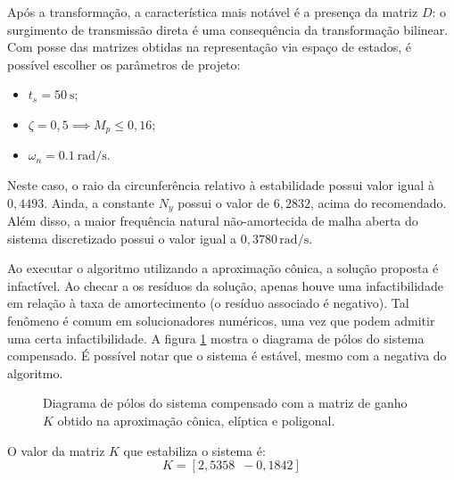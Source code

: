 Após a transformação, a característica mais notável é a presença da matriz $D$: o surgimento de transmissão direta é uma consequência da transformação bilinear\cite{CHIQUETO2021}. Com posse das matrizes obtidas na representação via espaço de estados, é possível escolher os parâmetros de projeto:
\begin{itemize}
\item $t_s = \SI{50}{\second}$;
\item $\zeta = 0,5 \implies M_p \leq 0,16$;
\item $\omega_n = \SI{0,1}{\radian/\second}$.
\end{itemize}

Neste caso, o raio da circunferência relativo à estabilidade possui valor igual à $0,4493$. Ainda, a constante $N_y$ possui o valor de $6,2832$, acima do recomendado. Além disso, a maior frequência natural não-amortecida de malha aberta do sistema discretizado possui o valor igual a $0,3780\,\si{\radian/\second}$.

Ao executar o algoritmo utilizando a aproximação cônica, a solução proposta é infactível. Ao checar a os resíduos da solução, apenas houve uma infactibilidade em relação à taxa de amortecimento (o resíduo associado é negativo). Tal fenômeno é comum em solucionadores numéricos, uma vez que podem admitir uma certa infactibilidade. A figura \ref{subfig:TesteC} mostra o diagrama de pólos do sistema compensado. É possível notar que o sistema é estável, mesmo com a negativa do algoritmo.

\begin{figure}[!ht]
\centering
\begin{subfigure}[t]{0.3\columnwidth}

\caption{}
\label{subfig:TesteC}
\end{subfigure}
\begin{subfigure}[t]{0.3\columnwidth}

\caption{}
\label{subfig:TesteE}
\end{subfigure}
\begin{subfigure}[t]{0.3\columnwidth}

\caption{}
\label{subfig:TesteP}
\end{subfigure}
\caption{Diagrama de pólos do sistema compensado com a matriz de ganho $K$ obtido na  aproximação cônica,  elíptica e  poligonal.}
\label{fig:PrimeiroTeste}
\end{figure}

O valor da matriz $K$ que estabiliza o sistema é:
\begin{equation}
K = \left[2,5358 \enspace -0,1842\right]\label{res:GanhoC}
\end{equation}

